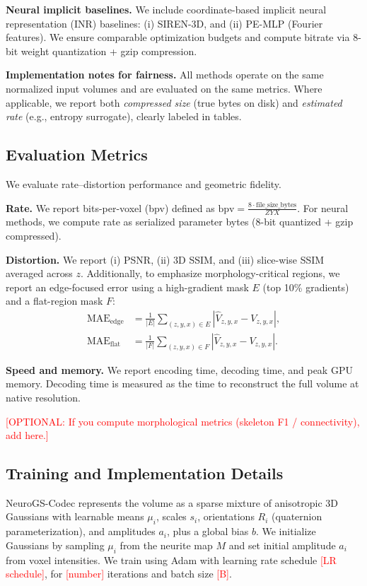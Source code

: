 \documentclass[11pt]{article}
\begin{document}
\textbf{Neural implicit baselines.}
We include coordinate-based implicit neural representation (INR) baselines:
(i) SIREN-3D, and (ii) PE-MLP (Fourier features).
We ensure comparable optimization budgets and compute bitrate via 8-bit weight quantization + gzip compression.

\textbf{Implementation notes for fairness.}
All methods operate on the same normalized input volumes and are evaluated on the same metrics.
Where applicable, we report both \textit{compressed size} (true bytes on disk) and \textit{estimated rate} (e.g., entropy surrogate), clearly labeled in tables.

\subsection{Evaluation Metrics}
\label{sec:metrics}
We evaluate rate--distortion performance and geometric fidelity.

\textbf{Rate.}
We report bits-per-voxel (bpv) defined as
$\text{bpv} = \frac{8 \cdot \text{file\_size\_bytes}}{Z Y X}$.
For neural methods, we compute rate as serialized parameter bytes (8-bit quantized + gzip compressed).

\textbf{Distortion.}
We report (i) PSNR, (ii) 3D SSIM, and (iii) slice-wise SSIM averaged across $z$.
Additionally, to emphasize morphology-critical regions, we report an edge-focused error using a high-gradient mask $E$ (top 10\% gradients) and a flat-region mask $F$:
\begin{align}
\text{MAE}_{\text{edge}} &= \frac{1}{|E|}\sum_{(z,y,x)\in E}\left| \hat{V}_{z,y,x} - V_{z,y,x}\right|, \\
\text{MAE}_{\text{flat}} &= \frac{1}{|F|}\sum_{(z,y,x)\in F}\left| \hat{V}_{z,y,x} - V_{z,y,x}\right|.
\end{align}

\textbf{Speed and memory.}
We report encoding time, decoding time, and peak GPU memory.
Decoding time is measured as the time to reconstruct the full volume at native resolution.

\textcolor{red}{[OPTIONAL: If you compute morphological metrics (skeleton F1 / connectivity), add here.]}

\subsection{Training and Implementation Details}
\label{sec:implementation}
NeuroGS-Codec represents the volume as a sparse mixture of anisotropic 3D Gaussians with learnable means $\mu_i$, scales $s_i$, orientations $R_i$ (quaternion parameterization), and amplitudes $a_i$, plus a global bias $b$.
We initialize Gaussians by sampling $\mu_i$ from the neurite map $M$ and set initial amplitude $a_i$ from voxel intensities.
We train using Adam with learning rate schedule \textcolor{red}{[LR schedule]}, for \textcolor{red}{[number]} iterations and batch size \textcolor{red}{[B]}.
\end{document}
